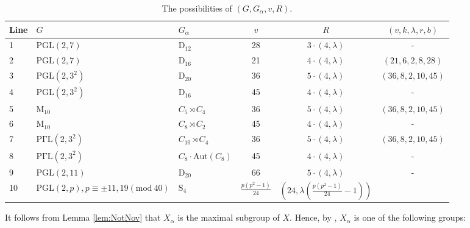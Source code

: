 \documentclass[a4paper,twopage,reqno,12pt]{amsart}
\theoremstyle{definition}
\numberwithin{equation}{section}
\newcommand{\PGaL}{\mathrm{P\Gamma L}}
\newcommand{\Aut}{\mathrm{Aut}}
\begin{document}
   

\begin{table}[h!]
\footnotesize
\caption{The possibilities of  $(G,G_{\alpha},v,R)$.}
\label{Tabb1}
\tiny
\begin{tabular}{lllccc}
\toprule
Line & $G$ & $G_\alpha$ & $v$ & $R$ & $(v,k,\lambda,r,b)$ \\
\midrule
1 & $\mathrm{PGL}(2,7)$         & $\mathrm{D_{12}}$                & 28 &  $3\cdot(4,\lambda)$ & -\\  
2 & $\mathrm{PGL}(2,7)$         & $\mathrm{D_{16}}$                & 21 &  $4\cdot(4,\lambda)$ & $(21, 6, 2, 8, 28)$\\  
3 & $\mathrm{PGL}(2,3^{2})$         & $\mathrm{D_{20}}$                & 36 &  $5\cdot(4,\lambda)$ & $(36, 8, 2, 10, 45)$\\  
4 & $\mathrm{PGL}(2,3^{2})$         & $\mathrm{D_{16}}$                & 45 &  $4\cdot(4,\lambda)$ & -\\  
5 & $\mathrm{M_{10}}$           & $C_{5}\rtimes C_4$               & 36 &  $5\cdot(4,\lambda)$ & $(36, 8, 2, 10, 45)$\\  
6 & $\mathrm{M_{10}}$           & $C_{8}\rtimes C_{2}$             & 45 &  $4\cdot(4,\lambda)$ & -\\  
7 & $\mathrm{\PGaL}(2,3^{2})$   & $C_{10}\rtimes C_{4}$            & 36 &  $5\cdot(4,\lambda)$ & $(36, 8, 2, 10, 45)$\\   
8 & $\mathrm{\PGaL}(2,3^{2})$   & $C_{8}\cdot \Aut(C_8)$            & 45 &  $4\cdot(4,\lambda)$ & -\\  
9 & $\mathrm{PGL}(2,11)$        & $\mathrm{D_{20}}$                & 66 &  $5\cdot(4,\lambda)$ & -\\ 
10& $\mathrm{PGL}(2,p),p\equiv \pm 11,19(\text{mod}~ 40)$ & $\mathrm{S_{4}}$  &$\frac{p(p^2-1)}{24}$  & $\left( 24,\lambda \left( \frac{p(p^{2}-1)}{24}-1\right) \right)$ &  \\
\bottomrule
\end{tabular}
\end{table}


\bigskip

It follows from Lemma \ref{lem:NotNov} that $X_\alpha$ is the maximal subgroup of $X$. Hence, by \cite{Di, Hup}, $X_\alpha$ is one of the following groups:
\end{document}
